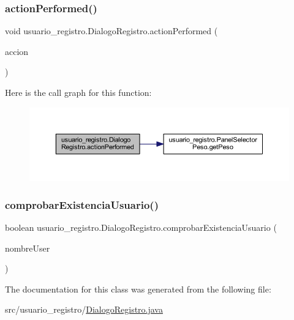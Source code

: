 \subsubsection{\texorpdfstring{action\+Performed()}{actionPerformed()}}
{\footnotesize\ttfamily void usuario\+\_\+registro.\+Dialogo\+Registro.\+action\+Performed (\begin{DoxyParamCaption}\item[{Action\+Event}]{accion }\end{DoxyParamCaption})}

Here is the call graph for this function\+:
\nopagebreak
\begin{figure}[H]
\begin{center}
\leavevmode
\includegraphics[width=350pt]{classusuario__registro_1_1_dialogo_registro_ac58a93d4081080e284d820523317aa58_cgraph}
\end{center}
\end{figure}
\mbox{\label{classusuario__registro_1_1_dialogo_registro_adabbf8a1002c48f738597b2fb49b3b93}} 
\subsubsection{\texorpdfstring{comprobar\+Existencia\+Usuario()}{comprobarExistenciaUsuario()}}
{\footnotesize\ttfamily boolean usuario\+\_\+registro.\+Dialogo\+Registro.\+comprobar\+Existencia\+Usuario (\begin{DoxyParamCaption}\item[{String}]{nombre\+User }\end{DoxyParamCaption})}



The documentation for this class was generated from the following file\+:\begin{DoxyCompactItemize}
\item 
src/usuario\+\_\+registro/\mbox{\hyperlink{_dialogo_registro_8java}{Dialogo\+Registro.\+java}}\end{DoxyCompactItemize}
